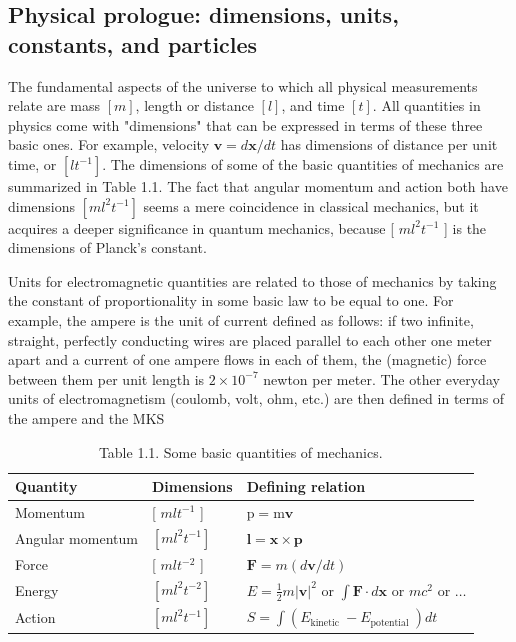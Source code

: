 \documentclass[10pt, letterpaper]{article}
\begin{document}
\subsection*{Physical prologue: dimensions, units, constants, and particles}
The fundamental aspects of the universe to which all physical measurements relate are mass $[m]$, length or distance $[l]$, and time $[t]$. All quantities in physics come with "dimensions" that can be expressed in terms of these three basic ones. For example, velocity $\mathbf{v}=d \mathbf{x} / d t$ has dimensions of distance per unit time, or $\left[l t^{-1}\right]$. The dimensions of some of the basic quantities of mechanics are summarized in Table 1.1. The fact that angular momentum and action both have dimensions $\left[m l^{2} t^{-1}\right]$ seems a mere coincidence in classical mechanics, but it acquires a deeper significance in quantum mechanics, because [ $m l^{2} t^{-1}$ ] is the dimensions of Planck's constant.

Units for electromagnetic quantities are related to those of mechanics by taking the constant of proportionality in some basic law to be equal to one. For example, the ampere is the unit of current defined as follows: if two infinite, straight, perfectly conducting wires are placed parallel to each other one meter apart and a current of one ampere flows in each of them, the (magnetic) force between them per unit length is $2 \times 10^{-7}$ newton per meter. The other everyday units of electromagnetism (coulomb, volt, ohm, etc.) are then defined in terms of the ampere and the MKS

\begin{table}[h]
\begin{center}
\begin{tabular}{|l|l|l|}
\hline
Quantity & Dimensions & Defining relation \\
\hline
Momentum & [ $m l t^{-1}$ ] & $\mathrm{p}=\mathrm{m} \mathbf{v}$ \\
\hline
Angular momentum & $\left[m l^{2} t^{-1}\right]$ & $\mathbf{l}=\mathbf{x} \times \mathbf{p}$ \\
\hline
Force & [ $m l t^{-2}$ ] & $\mathbf{F}=m(d \mathbf{v} / d t)$ \\
\hline
Energy & $\left[m l^{2} t^{-2}\right]$ & $E=\frac{1}{2} m|\mathbf{v}|^{2}$ or $\int \mathbf{F} \cdot d \mathbf{x}$ or $m c^{2}$ or $\ldots$ \\
\hline
Action & $\left[m l^{2} t^{-1}\right]$ & $S=\int\left(E_{\text {kinetic }}-E_{\text {potential }}\right) d t$ \\
\hline
\end{tabular}

\caption{Table 1.1. Some basic quantities of mechanics.}
\end{center}
\end{table}
\end{document}
